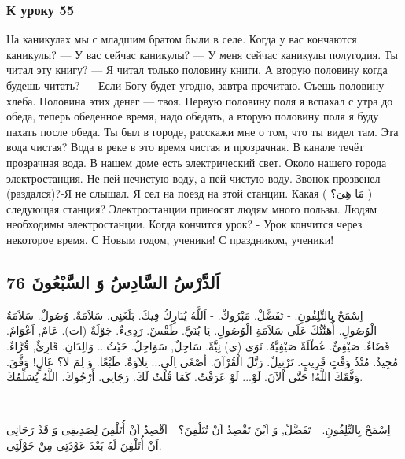\documentclass[a5paper]{article}
\begin{document}
\subsubsection{К уроку 55}
На каникулах мы с младшим братом были в селе. Когда у вас кончаются каникулы? — У вас сейчас каникулы? — У меня сейчас каникулы полугодия. Ты читал эту книгу? — Я читал только половину книги. А вторую половину когда будешь читать? — Если Богу будет угодно, завтра прочитаю. Съешь половину хлеба. Половина этих денег — твоя. Первую половину поля я вспахал с утра до обеда, теперь обеденное время, надо обедать, а вторую половину поля я буду пахать после обеда. Ты был в городе, расскажи мне о том, что ты видел там. Эта вода чистая? Вода в реке в это время чистая и прозрачная. В канале течёт прозрачная вода. В нашем доме есть электрический свет. Около нашего города электростанция. Не пей нечистую воду, а пей чистую воду. Звонок прозвенел (раздался)?-Я не слышал. Я сел на поезд на этой станции. Какая ( مَا هِىَ؟ ) следующая станция? Электростанции приносят людям много пользы. Людям необходимы электростанции. Когда кончится урок? - Урок кончится через некоторое время. С Новым годом, ученики! С праздником, ученики!

\subsection{اَلدَّرْسُ السَّادِسُ وَ السَّبْعُونَ 76}
اِسْمَحْ بِالتِّلِفُونِ. - تَفَضَّلْ. مَبْرُوكْ. - اَللَّهُ يُبَارِكُ فِيكَ. بَلَغَنِى. سَلاَمَةٌ. وُصُولٌ. سَلاَمَةُ الْوُصُولِ. أُهَنِّئُكَ عَلَى سَلاَمَةِ الْوُصُولِ. يَا بُنَيَّ. طَقْسٌ. رَدِىءٌ. جَوْلَةٌ (ات). عَامٌ, اَعْوَامٌ. قَضَاءٌ. صَيْفِىٌّ. عُطْلَةٌ صَيْفِيَّةٌ. \newline
نَوَى (ى) نِيَّةٌ. سَاحِلٌ, سَوَاحِلُ. حَيْثُ... وَالِدَانِ. قَارِئٌ, قُرَّاءٌ. مُجِيدٌ. مُنْذُ وَقْتٍ قَرِيبٍ. تَرْتِيلٌ. رَتَّلَ الْقُرْآنَ. أَصْغَى اِلَى... تِلاَوَةٌ. طَبْعًا. وَ لِمَ لاَ؟ عَالٍ! وَفَّقَ. وَفَّقَكَ اللَّهُ! حَتَّى اْلآنَ. لَوْ... لَوْ عَرَفْتُ. كَمَا قُلْتُ لَكَ. رَجَانِى. أَرْجُوكَ. اللَّهُ يُسَلِّمُكَ.

\_\_\_\_\_\_\_\_\_\_\_\_\_\_\_\_\_\_\_\_\_\_\_\_\_\_\_\_\_\_\_

اِسْمَحْ بِالتِّلِفُونِ. - تَفَضَّلْ, وَ اَيْنَ تَقْصِدُ اَنْ تُتَلْفِنَ؟ - اَقْصِدُ اَنْ أُتَلْفِنَ لِصَدِيقِى وَ قَدْ رَجَانِى اَنْ أُتَلْفِنَ لَهُ بَعْدَ عَوْدَتِى مِنْ جَوْلَتِى.
\end{document}
